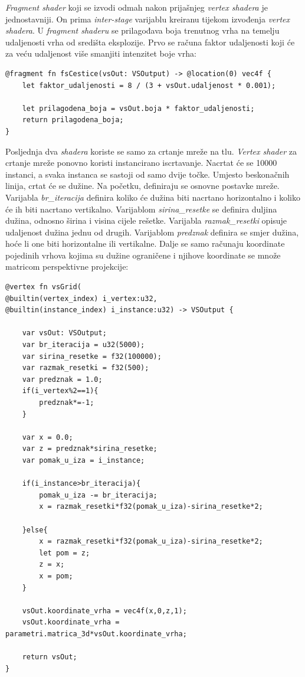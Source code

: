 \documentclass{foi}
\begin{document}
\textit{Fragment shader} koji se izvodi odmah nakon prijašnjeg \textit{vertex shadera} je jednostavniji. On prima \textit{inter-stage} varijablu kreiranu tijekom izvođenja \textit{vertex shadera}. U \textit{fragment shaderu} se prilagođava boja trenutnog vrha na temelju udaljenosti vrha od središta eksplozije. Prvo se računa faktor udaljenosti koji će za veću udaljenost više smanjiti intenzitet boje vrha:

\begin{verbatim}
@fragment fn fsCestice(vsOut: VSOutput) -> @location(0) vec4f {
	let faktor_udaljenosti = 8 / (3 + vsOut.udaljenost * 0.001);
	
	let prilagodena_boja = vsOut.boja * faktor_udaljenosti;
	return prilagodena_boja;
}
\end{verbatim}

Posljednja dva \textit{shadera} koriste se samo za crtanje mreže na tlu. \textit{Vertex shader} za crtanje mreže ponovno koristi instancirano iscrtavanje. Nacrtat će se 10000 instanci, a svaka instanca se sastoji od samo dvije točke. Umjesto beskonačnih linija, crtat će se dužine. Na početku, definiraju se osnovne postavke mreže. Varijabla \textit{br\_iteracija} definira koliko će dužina biti nacrtano horizontalno i koliko će ih biti nacrtano vertikalno. Varijablom \textit{sirina\_resetke} se definira duljina dužina, odnosno širina i visina cijele rešetke. Varijabla \textit{razmak\_resetki} opisuje udaljenost dužina jednu od drugih. Varijablom \textit{predznak} definira se smjer dužina, hoće li one biti horizontalne ili vertikalne. Dalje se samo računaju koordinate pojedinih vrhova kojima su dužine ograničene i njihove koordinate se množe matricom perspektivne projekcije:
\begin{verbatim}
@vertex fn vsGrid(
@builtin(vertex_index) i_vertex:u32,
@builtin(instance_index) i_instance:u32) -> VSOutput {
	
	var vsOut: VSOutput;
	var br_iteracija = u32(5000);
	var sirina_resetke = f32(100000);
	var razmak_resetki = f32(500);
	var predznak = 1.0;
	if(i_vertex%2==1){
		predznak*=-1;
	}
	
	var x = 0.0;
	var z = predznak*sirina_resetke;
	var pomak_u_iza = i_instance;
	
	if(i_instance>br_iteracija){
		pomak_u_iza -= br_iteracija;
		x = razmak_resetki*f32(pomak_u_iza)-sirina_resetke*2;
		
	}else{
		x = razmak_resetki*f32(pomak_u_iza)-sirina_resetke*2;
		let pom = z;
		z = x;
		x = pom;
	}
	
	vsOut.koordinate_vrha = vec4f(x,0,z,1);
	vsOut.koordinate_vrha = parametri.matrica_3d*vsOut.koordinate_vrha;
	
	return vsOut;
}

\end{verbatim}
\end{document}
